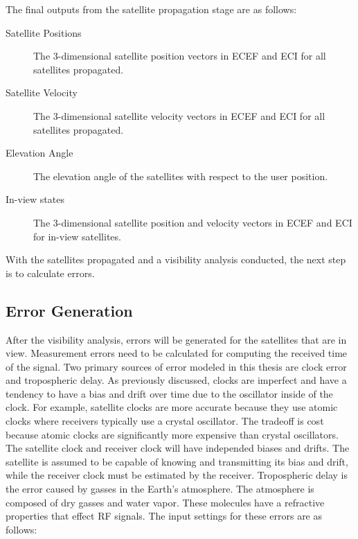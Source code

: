 \documentclass[12pt]{report}
\begin{document}
The final outputs from the satellite propagation stage are as follows:
\begin{description}
    \item[Satellite Positions] The 3-dimensional satellite position vectors in ECEF and ECI for all satellites propagated.
    \item[Satellite Velocity] The 3-dimensional satellite velocity vectors in ECEF and ECI for all satellites propagated.
    \item[Elevation Angle] The elevation angle of the satellites with respect to the user position.
    \item[In-view states] The 3-dimensional satellite position and velocity vectors in ECEF and ECI for in-view satellites.
\end{description}

With the satellites propagated and a visibility analysis conducted, the next step is to calculate errors.

\subsection{Error Generation}

After the visibility analysis, errors will be generated for the satellites that are in view. Measurement errors need to be calculated for computing the received time of the signal. Two primary sources of error modeled in this thesis are clock error and tropospheric delay. As previously discussed, clocks are imperfect and have a tendency to have a bias and drift over time due to the oscillator inside of the clock. For example, satellite clocks are more accurate because they use atomic clocks where receivers typically use a crystal oscillator. The tradeoff is cost because atomic clocks are significantly more expensive than crystal oscillators. The satellite clock and receiver clock will have independed biases and drifts. The satellite is assumed to be capable of knowing and transmitting its bias and drift, while the receiver clock must be estimated by the receiver. Tropospheric delay is the error caused by gasses in the Earth's atmosphere. The atmosphere is composed of dry gasses and water vapor. These molecules have a refractive properties that effect RF signals. The input settings for these errors are as follows:
\end{document}
